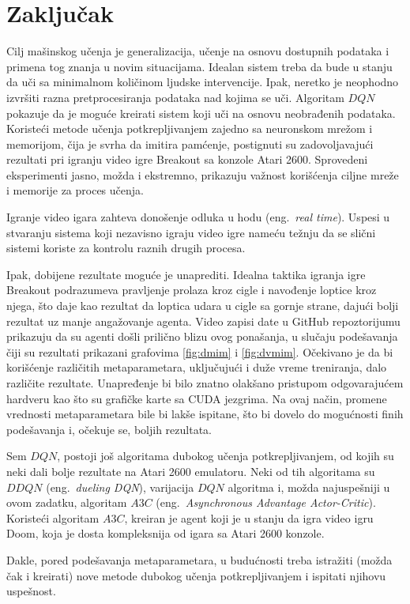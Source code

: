 \chapter{Zaključak}
\label{ch:zakljucak}

Cilj mašinskog učenja je generalizacija, učenje na osnovu dostupnih podataka i primena tog znanja u novim situacijama. Idealan sistem treba da bude u stanju da uči sa minimalnom količinom ljudske intervencije. Ipak, neretko je neophodno izvršiti razna pretprocesiranja podataka nad kojima se uči. Algoritam $DQN$ pokazuje da je moguće kreirati sistem koji uči na osnovu neobrađenih podataka. Koristeći metode učenja potkrepljivanjem zajedno sa neuronskom mrežom i memorijom, čija je svrha da imitira pamćenje, postignuti su zadovoljavajući rezultati pri igranju video igre Breakout sa konzole Atari 2600. Sprovedeni eksperimenti jasno, možda i ekstremno, prikazuju važnost korišćenja ciljne mreže i memorije za proces učenja.
\par 
Igranje video igara zahteva donošenje odluka u hodu (eng.~{\em real time}). Uspesi u stvaranju sistema koji nezavisno igraju video igre nameću težnju da se slični sistemi koriste za kontrolu raznih drugih procesa. 
\par 
Ipak, dobijene rezultate moguće je unaprediti. Idealna taktika igranja igre Breakout podrazumeva pravljenje prolaza kroz cigle i navođenje loptice kroz njega, što daje kao rezultat da loptica udara u cigle sa gornje strane, dajući bolji rezultat uz manje angažovanje agenta. Video zapisi date u GitHub repoztorijumu prikazuju da su agenti došli prilično blizu ovog ponašanja, u slučaju podešavanja čiji su rezultati prikazani grafovima \ref{fig:dmim} i \ref{fig:dvmim}. Očekivano je da bi korišćenje različitih metaparametara, uključujući i duže vreme treniranja, dalo različite rezultate. Unapređenje bi bilo znatno olakšano pristupom odgovarajućem hardveru kao što su grafičke karte sa CUDA jezgrima. Na ovaj način, promene vrednosti metaparametara bile bi lakše ispitane, što bi dovelo do mogućnosti finih podešavanja i, očekuje se, boljih rezultata.
\par 
Sem $DQN$, postoji još algoritama dubokog učenja potkrepljivanjem, od kojih su neki dali bolje rezultate na Atari 2600 emulatoru. Neki od tih algoritama su $DDQN$ \cite{ddqn} (eng.~{\em dueling DQN}), varijacija $DQN$ algoritma i, možda najuspešniji u ovom zadatku, algoritam $A3C$ \cite{a3c} (eng.~{\em Asynchronous Advantage Actor-Critic}). Koristeći algoritam $A3C$, kreiran je agent koji je u stanju da igra video igru Doom, koja je dosta kompleksnija od igara sa Atari 2600 konzole.
\par 
Dakle, pored podešavanja metaparametara, u budućnosti treba istražiti (možda čak i kreirati) nove metode dubokog učenja potkrepljivanjem i ispitati njihovu uspešnost.



